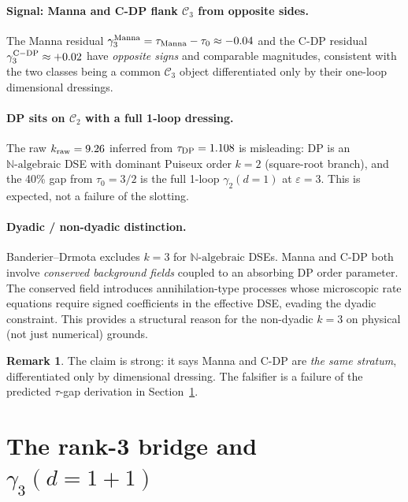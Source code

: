 \documentclass[10pt,a4paper,twocolumn]{article}
\theoremstyle{plain}
\theoremstyle{definition}
\newtheorem{remark}{Remark}
\newcommand{\eps}{\varepsilon}
\newcommand{\Cstr}[1]{\mathcal{C}_{#1}}
\newcommand{\Nalg}{\mathbb{N}\text{-algebraic}}
\begin{document}
\paragraph{Signal: Manna and C-DP flank $\Cstr{3}$ from opposite sides.}
The Manna residual $\gamma_3^{\rm Manna} = \tau_{\rm Manna} - \tau_0
\approx -0.04$ and the C-DP residual $\gamma_3^{\rm C-DP} \approx
+0.02$ have \emph{opposite signs} and comparable magnitudes,
consistent with the two classes being a common $\Cstr{3}$ object
differentiated only by their one-loop dimensional dressings.

\paragraph{DP sits on $\Cstr{2}$ with a full 1-loop dressing.}
The raw $k_{\rm raw} = 9.26$ inferred from $\tau_{\rm DP} = 1.108$ is
misleading: DP is an $\Nalg$ DSE with dominant Puiseux order $k=2$
(square-root branch), and the 40\% gap from $\tau_0 = 3/2$ is the
full 1-loop $\gamma_2(d=1)$ at $\eps = 3$.  This is expected, not a
failure of the slotting.

\paragraph{Dyadic / non-dyadic distinction.}
Banderier--Drmota excludes $k=3$ for $\Nalg$ DSEs.  Manna and C-DP
both involve \emph{conserved background fields} coupled to an
absorbing DP order parameter.  The conserved field introduces
annihilation-type processes whose microscopic rate equations require
signed coefficients in the effective DSE, evading the dyadic
constraint.  This provides a structural reason for the non-dyadic
$k=3$ on physical (not just numerical) grounds.

\begin{remark}
The claim is strong: it says Manna and C-DP are \emph{the same
stratum}, differentiated only by dimensional dressing.  The falsifier
is a failure of the predicted $\tau$-gap derivation in
Section~\ref{sec:gamma3}.
\end{remark}

\section{The rank-3 bridge and $\gamma_3(d=1+1)$}
\label{sec:gamma3}
\end{document}
